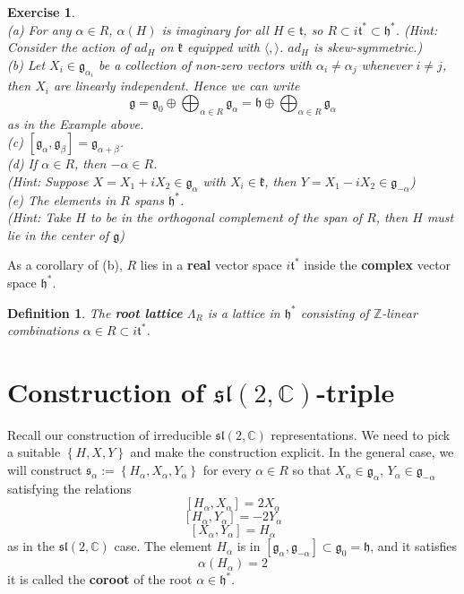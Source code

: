 \documentclass[11pt]{book}
\newtheorem{exercise}[theorem]{Exercise}
\newtheorem{definition}[theorem]{Definition}
\newcommand{\bb}[1]{\mathbb{#1}}
\newcommand{\mf}[1]{\mathfrak{#1}}
\begin{document}
\begin{exercise} \mbox{}\\
(a) For any $\alpha \in R$, $\alpha(H)$ is imaginary for all $H \in \mf{t}$, so $R \subset i\mf{t}^* \subset \mf{h}^*$. (Hint: Consider the action of $ad_H$ on $\mf{k}$ equipped with $\langle, \rangle$. $ad_H$ is skew-symmetric.) \\
(b) Let $X_i \in \mf{g}_{\alpha_i}$ be a collection of non-zero vectors with $\alpha_i \neq \alpha_j$ whenever $i \neq j$, then $X_i$ are linearly independent. Hence we can write
$$\mf{g} = \mf{g}_0 \oplus \bigoplus_{\alpha \in R} \mf{g}_{\alpha} = \mf{h} \oplus \bigoplus_{\alpha \in R} \mf{g}_{\alpha}$$
as in the Example above.\\
(c) $[\mf{g}_{\alpha}, \mf{g}_{\beta}] = \mf{g}_{\alpha + \beta}$.\\
(d) If $\alpha \in R$, then $-\alpha \in R$. \\
(Hint: Suppose $X = X_1 + iX_2 \in \mf{g}_{\alpha}$ with $X_i \in \mf{k}$, then $Y = X_1 - iX_2 \in \mf{g}_{-\alpha}$)\\
(e) The elements in $R$ spans $\mf{h}^*$.\\
(Hint: Take $H$ to be in the orthogonal complement of the span of $R$, then $H$ must lie in the center of $\mf{g}$)
\end{exercise}
As a corollary of (b), $R$ lies in a \textbf{real} vector space $i \mf{t}^*$ inside the \textbf{complex} vector space $\mf{h}^*$.
\begin{definition}
The \textbf{root lattice} $\Lambda_R$ is a lattice in $\mf{h}^*$ consisting of $\bb{Z}$-linear combinations $\alpha \in R \subset i\mf{t}^*$.
\end{definition}


\section{Construction of $\mf{sl}(2,\bb{C})$-triple}
Recall our construction of irreducible $\mf{sl}(2,\bb{C})$ representations. We need to pick a suitable $\left\{H, X, Y\right\}$ and make the construction explicit. In the general case, we will construct $\mf{s}_{\alpha} := \left\{H_{\alpha}, X_{\alpha}, Y_{\alpha}\right\}$ for every $\alpha \in R$ so that $X_{\alpha} \in \mf{g}_{\alpha}$, $Y_{\alpha} \in \mf{g}_{-\alpha}$ satisfying the relations
$$[H_{\alpha}, X_{\alpha}] = 2X_{\alpha}$$
$$[H_{\alpha}, Y_{\alpha}] = -2Y_{\alpha}$$
$$[X_{\alpha}, Y_{\alpha}] = H_{\alpha}$$
as in the $\mf{sl}(2,\bb{C})$ case. The element $H_{\alpha}$ is in $[\mf{g}_{\alpha}, \mf{g}_{-\alpha}] \subset \mf{g}_0 = \mf{h}$, and it satisfies
$$\alpha(H_{\alpha}) = 2$$
it is called the \textbf{coroot} of the root $\alpha \in \mf{h}^*$.
\end{document}
